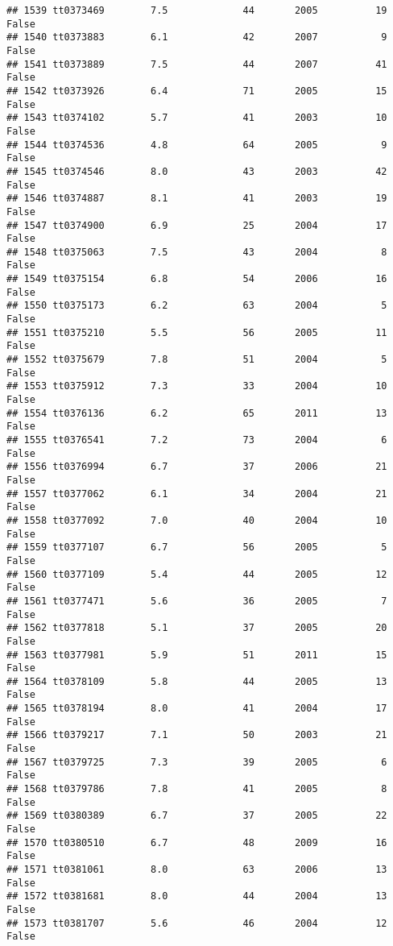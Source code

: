 \documentclass[
]{article}
\begin{document}
\begin{verbatim}
## 1539 tt0373469        7.5             44       2005          19   False
## 1540 tt0373883        6.1             42       2007           9   False
## 1541 tt0373889        7.5             44       2007          41   False
## 1542 tt0373926        6.4             71       2005          15   False
## 1543 tt0374102        5.7             41       2003          10   False
## 1544 tt0374536        4.8             64       2005           9   False
## 1545 tt0374546        8.0             43       2003          42   False
## 1546 tt0374887        8.1             41       2003          19   False
## 1547 tt0374900        6.9             25       2004          17   False
## 1548 tt0375063        7.5             43       2004           8   False
## 1549 tt0375154        6.8             54       2006          16   False
## 1550 tt0375173        6.2             63       2004           5   False
## 1551 tt0375210        5.5             56       2005          11   False
## 1552 tt0375679        7.8             51       2004           5   False
## 1553 tt0375912        7.3             33       2004          10   False
## 1554 tt0376136        6.2             65       2011          13   False
## 1555 tt0376541        7.2             73       2004           6   False
## 1556 tt0376994        6.7             37       2006          21   False
## 1557 tt0377062        6.1             34       2004          21   False
## 1558 tt0377092        7.0             40       2004          10   False
## 1559 tt0377107        6.7             56       2005           5   False
## 1560 tt0377109        5.4             44       2005          12   False
## 1561 tt0377471        5.6             36       2005           7   False
## 1562 tt0377818        5.1             37       2005          20   False
## 1563 tt0377981        5.9             51       2011          15   False
## 1564 tt0378109        5.8             44       2005          13   False
## 1565 tt0378194        8.0             41       2004          17   False
## 1566 tt0379217        7.1             50       2003          21   False
## 1567 tt0379725        7.3             39       2005           6   False
## 1568 tt0379786        7.8             41       2005           8   False
## 1569 tt0380389        6.7             37       2005          22   False
## 1570 tt0380510        6.7             48       2009          16   False
## 1571 tt0381061        8.0             63       2006          13   False
## 1572 tt0381681        8.0             44       2004          13   False
## 1573 tt0381707        5.6             46       2004          12   False

\end{verbatim}
\end{document}

